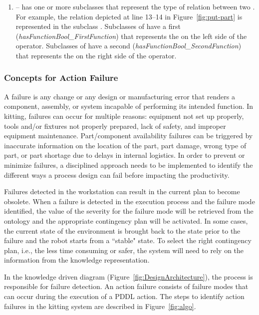 \begin{enumerate}
\item {} --  has one or more subclasses that represent the type of relation between two . For example, the relation depicted at line 13--14 in Figure~\ref{fig:put-part} is represented in the subclass . Subclasses of  have a first  (\emph{hasFunctionBool\_FirstFunction}) that represents the  on the left side of the operator. Subclasses of  have a second  (\emph{hasFunctionBool\_SecondFunction}) that represents the  on the right side of the operator.
\end{enumerate}

\subsubsection{Concepts for Action Failure}\label{sss:failure}
 A failure is any change or any design or manufacturing error that renders a component, assembly, or system incapable of performing its intended function. In kitting, failures can occur for multiple reasons: equipment not set up properly, tools and/or fixtures not properly prepared, lack of safety, and improper equipment maintenance. Part/component availability failures can be triggered by inaccurate information on the location of the part, part damage, wrong type of part, or part shortage due to delays in internal logistics. In order to prevent or minimize failures, a disciplined approach needs to be implemented to identify the different ways a process design can fail before impacting the productivity. 
 
 Failures detected in the workstation can result in the current plan to become obsolete. When a failure is detected in the execution process and the failure mode identified, the value of the severity for the failure mode will be retrieved from the ontology and the appropriate contingency plan will be activated. In some cases, the current state of the environment is brought back to the state prior to the failure and the robot starts from a ``stable" state. To select the right contingency plan, i.e., the less time consuming or safer, the system will need to rely on the information from the knowledge representation.
 
 In the knowledge driven diagram (Figure~\ref{fig:DesignArchitecture}), the  process is responsible for failure detection. An action failure consists of failure modes that can occur during the execution of a PDDL action. The steps to identify action failures in the kitting system are described in Figure~\ref{fig:algo}.

